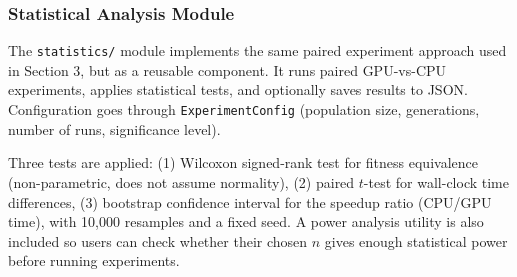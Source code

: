 \documentclass[a4paper,14pt]{extarticle}
\begin{document}
\subsubsection*{Statistical Analysis Module}

The \texttt{statistics/} module implements the same paired experiment approach used in Section 3, but as a reusable component. It runs paired GPU-vs-CPU experiments, applies statistical tests, and optionally saves results to JSON. Configuration goes through \texttt{ExperimentConfig} (population size, generations, number of runs, significance level).

Three tests are applied:
(1) Wilcoxon signed-rank test for fitness equivalence (non-parametric, does not assume normality),
(2) paired $t$-test for wall-clock time differences,
(3) bootstrap confidence interval for the speedup ratio (CPU/GPU time), with 10{,}000 resamples and a fixed seed.
A power analysis utility is also included so users can check whether their chosen $n$ gives enough statistical power before running experiments.
\end{document}
